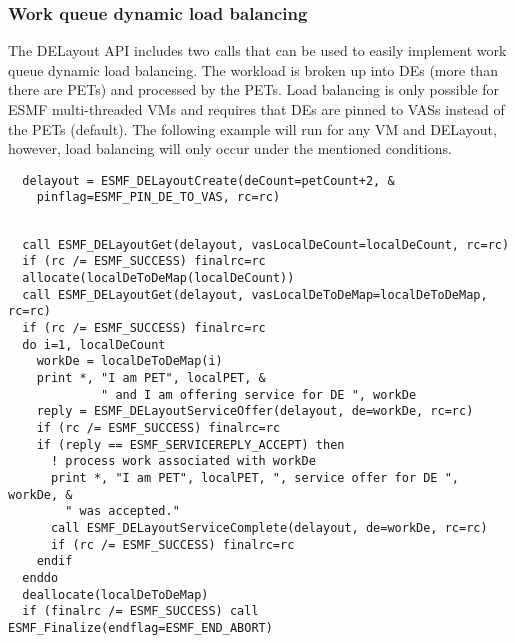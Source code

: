 
   \subsubsection{Work queue dynamic load balancing}
   
   The DELayout API includes two calls that can be used to easily implement
   work queue dynamic load balancing. The workload is broken up into DEs
   (more than there are PETs) and processed by the PETs. Load balancing is
   only possible for ESMF multi-threaded VMs and requires that DEs are pinned
   to VASs instead of the PETs (default). The following example will
   run for any VM and DELayout, however, load balancing will only occur under the
   mentioned conditions. 

 \begin{verbatim}
  delayout = ESMF_DELayoutCreate(deCount=petCount+2, &
    pinflag=ESMF_PIN_DE_TO_VAS, rc=rc)
 
\end{verbatim}
 

 \begin{verbatim}
  call ESMF_DELayoutGet(delayout, vasLocalDeCount=localDeCount, rc=rc)
  if (rc /= ESMF_SUCCESS) finalrc=rc
  allocate(localDeToDeMap(localDeCount))
  call ESMF_DELayoutGet(delayout, vasLocalDeToDeMap=localDeToDeMap, rc=rc)
  if (rc /= ESMF_SUCCESS) finalrc=rc
  do i=1, localDeCount
    workDe = localDeToDeMap(i)
    print *, "I am PET", localPET, &
             " and I am offering service for DE ", workDe
    reply = ESMF_DELayoutServiceOffer(delayout, de=workDe, rc=rc)
    if (rc /= ESMF_SUCCESS) finalrc=rc
    if (reply == ESMF_SERVICEREPLY_ACCEPT) then
      ! process work associated with workDe
      print *, "I am PET", localPET, ", service offer for DE ", workDe, &
        " was accepted."
      call ESMF_DELayoutServiceComplete(delayout, de=workDe, rc=rc)
      if (rc /= ESMF_SUCCESS) finalrc=rc
    endif
  enddo
  deallocate(localDeToDeMap)
  if (finalrc /= ESMF_SUCCESS) call ESMF_Finalize(endflag=ESMF_END_ABORT)
 
\end{verbatim}

\setlength{\parskip}{\oldparskip}
\setlength{\parindent}{\oldparindent}
\setlength{\baselineskip}{\oldbaselineskip}

